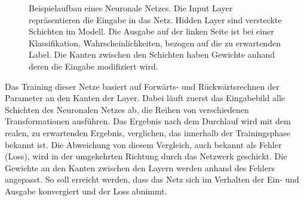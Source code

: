 \def\layersep{2.5cm}
\begin{figure}[!tb]\centering
{}
\caption[Beispielaufbau eines Neuronale Netzes]{Beispielaufbau eines Neuronale Netzes. Die Input Layer repräsentieren die Eingabe in das Netz. Hidden Layer sind versteckte Schichten im Modell. Die Ausgabe auf der linken Seite ist bei einer Klassifikation, Wahrscheinlichkeiten, bezogen auf die  zu erwartenden Label. Die Kanten zwischen den Schichten haben Gewichte anhand deren die Eingabe modifiziert wird.}\label{cap:neuralnet}
\end{figure}\label{fig:neuralnet}

Das Training dieser Netze basiert auf Forwärts- und Rückwärtsrechnen der Parameter an den Kanten der Layer. Dabei läuft zuerst das Eingabebild alle Schichten des Neuronalen Netzes ab, die Reihen von verschiedenen Transformationen ausführen. Das Ergebnis nach dem Durchlauf wird mit dem realen, zu erwartenden Ergebnis, verglichen, das innerhalb der Trainingsphase bekannt ist. Die Abweichung von diesem Vergleich, auch bekannt als Fehler (Loss), wird in der umgekehrten Richtung durch das Netzwerk geschickt. Die Gewichte an den Kanten zwischen den Layern werden anhand des Fehlers angepasst. So soll erreicht werden, dass das Netz sich im Verhalten der Ein- und Ausgabe konvergiert und der Loss abnimmt.

